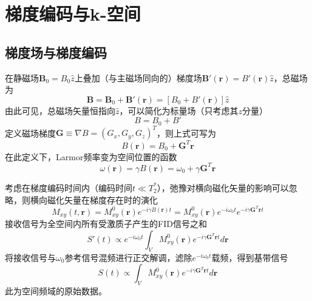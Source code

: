 \documentclass[12pt]{article}
\begin{document}
\section{梯度编码与k-空间}
\subsection{梯度场与梯度编码}
在静磁场$\bm{B}_0=B_0\hat{z}$上叠加（与主磁场同向的）梯度场$\bm{B}'(\bm{r})=B'(\bm{r})\hat{z}$，总磁场为
\begin{equation}
    \bm{B}=\bm{B}_0+\bm{B}'(\bm{r})=\left[B_0+B'(\bm{r})\right]\hat{z}
\end{equation}
由此可见，总磁场矢量恒指向$\hat{z}$，可以简化为标量场（只考虑其$z$分量）
\begin{equation}
    B=B_0+B'
\end{equation}
定义磁场梯度$\bm{G}\equiv\nabla B=(G_x,G_y,G_z)^T$，则上式可写为
\begin{equation}
    B(\bm{r})=B_0+\bm{G}^T\bm{r}
\end{equation}
在此定义下，Larmor频率变为空间位置的函数
\begin{equation}
    \omega(\bm{r})=\gamma B(\bm{r})=\omega_0+\gamma\bm{G}^T\bm{r}
\end{equation}

考虑在梯度编码时间内（编码时间$t\ll T_2^*$），弛豫对横向磁化矢量的影响可以忽略，则横向磁化矢量在梯度存在时的演化
\begin{equation}
    M_{xy}(t,\bm{r}) = M_{xy}^0(\bm{r})e^{-i\gamma B(\bm{r})t}=M_{xy}^0(\bm{r})e^{-i\omega_0t}e^{-i\gamma\bm{G}^T\bm{r}t}
\end{equation}
接收信号为全空间内所有受激质子产生的FID信号之和
\begin{equation}
    S'(t)\propto e^{-i\omega_0t}\int_{V} M_{xy}^0(\bm{r})e^{-i\gamma \bm{G}^T\bm{r}t} d\bm{r}
\end{equation}
将接收信号与$\omega_0$参考信号混频进行正交解调，滤除$e^{-i\omega_0t}$载频，得到基带信号
\begin{equation}
    S(t)\propto\int_{V} M_{xy}^0(\bm{r})e^{-i\gamma\bm{G}^T\bm{r}t} d\bm{r}
    \label{equ:S_org}
\end{equation}
此为空间频域的原始数据。
\end{document}
